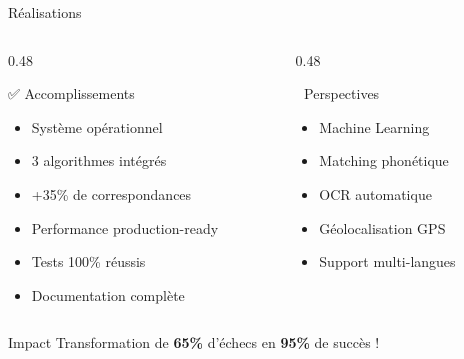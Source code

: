 \documentclass[aspectratio=169]{beamer}
\begin{document}
\begin{frame}{Réalisations}
    \begin{columns}[T]
        \begin{column}{0.48\textwidth}
            \begin{block}{✅ Accomplissements}
                \begin{itemize}
                    \item Système opérationnel
                    \item 3 algorithmes intégrés
                    \item +35\% de correspondances
                    \item Performance production-ready
                    \item Tests 100\% réussis
                    \item Documentation complète
                \end{itemize}
            \end{block}
        \end{column}
        \begin{column}{0.48\textwidth}
            \begin{block}{🔮 Perspectives}
                \begin{itemize}
                    \item Machine Learning
                    \item Matching phonétique
                    \item OCR automatique
                    \item Géolocalisation GPS
                    \item Support multi-langues
                \end{itemize}
            \end{block}
        \end{column}
    \end{columns}

    \vspace{0.5cm}

    \begin{exampleblock}{Impact}
        \centering
        \Large Transformation de \textbf{65\%} d'échecs en \textbf{95\%} de succès !
    \end{exampleblock}
\end{frame}

\end{document}
